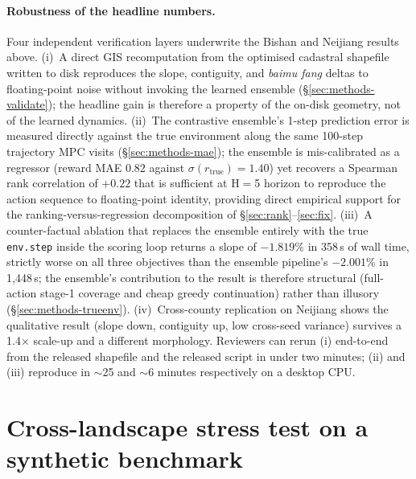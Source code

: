 \documentclass[11pt]{article}
\begin{document}
\paragraph{Robustness of the headline numbers.} Four independent verification layers underwrite the Bishan and Neijiang results above. (i)~A direct GIS recomputation from the optimised cadastral shapefile written to disk reproduces the slope, contiguity, and \textit{baimu fang} deltas to floating-point noise without invoking the learned ensemble (\S\ref{sec:methods-validate}); the headline gain is therefore a property of the on-disk geometry, not of the learned dynamics. (ii)~The contrastive ensemble's 1-step prediction error is measured directly against the true environment along the same 100-step trajectory MPC visits (\S\ref{sec:methods-mae}); the ensemble is mis-calibrated as a regressor (reward MAE $0.82$ against $\sigma(r_{\text{true}})=1.40$) yet recovers a Spearman rank correlation of $+0.22$ that is sufficient at H$=$5 horizon to reproduce the action sequence to floating-point identity, providing direct empirical support for the ranking-versus-regression decomposition of \S\ref{sec:rank}--\ref{sec:fix}. (iii)~A counter-factual ablation that replaces the ensemble entirely with the true \texttt{env.step} inside the scoring loop returns a slope of $-1.819\%$ in 358\,s of wall time, strictly worse on all three objectives than the ensemble pipeline's $-2.001\%$ in 1{,}448\,s; the ensemble's contribution to the result is therefore structural (full-action stage-1 coverage and cheap greedy continuation) rather than illusory (\S\ref{sec:methods-trueenv}). (iv)~Cross-county replication on Neijiang shows the qualitative result (slope down, contiguity up, low cross-seed variance) survives a 1.4$\times$ scale-up and a different morphology. Reviewers can rerun (i) end-to-end from the released shapefile and the released script in under two minutes; (ii) and (iii) reproduce in $\sim$25 and $\sim$6 minutes respectively on a desktop CPU.

\section{Cross-landscape stress test on a synthetic benchmark}\label{sec:bench}
\end{document}
